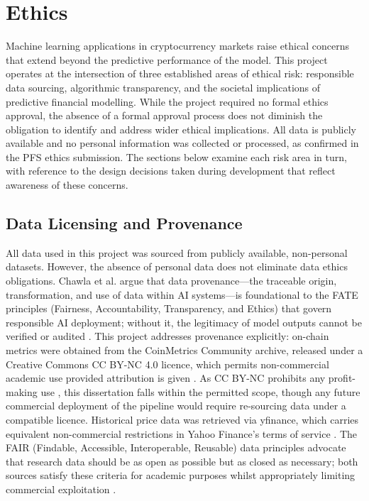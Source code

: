 
\section{Ethics}
\label{sec: Ethics}
Machine learning applications in cryptocurrency markets raise ethical concerns that extend beyond the predictive performance of the model. This project operates at the intersection of three established areas of ethical risk: responsible data sourcing, algorithmic transparency, and the societal implications of predictive financial modelling. While the project required no formal ethics approval, the absence of a formal approval process does not diminish the obligation to identify and address wider ethical implications. All data is publicly available and no personal information was collected or processed, as confirmed in the PFS ethics submission. The sections below examine each risk area in turn, with reference to the design decisions taken during development that reflect awareness of these concerns.
\subsection{Data Licensing and Provenance}
All data used in this project was sourced from publicly available, non-personal datasets. However, the absence of personal data does not eliminate data ethics obligations. Chawla et al. argue that data provenance—the traceable origin, transformation, and use of data within AI systems—is foundational to the FATE principles (Fairness, Accountability, Transparency, and Ethics) that govern responsible AI deployment; without it, the legitimacy of model outputs cannot be verified or audited \cite{memarianFairnessAccountabilityTransparency2023}. This project addresses provenance explicitly: on-chain metrics were obtained from the CoinMetrics Community archive, released under a Creative Commons CC BY-NC 4.0 licence, which permits non-commercial academic use provided attribution is given \cite{coinMetrics}. As CC BY-NC prohibits any profit-making use \cite{byBringingTransparencyData2025}, this dissertation falls within the permitted scope, though any future commercial deployment of the pipeline would require re-sourcing data under a compatible licence. Historical price data was retrieved via yfinance, which carries equivalent non-commercial restrictions in Yahoo Finance's terms of service \cite{YahooDeveloperAPI, YahooTermsService}. The FAIR (Findable, Accessible, Interoperable, Reusable) data principles advocate that research data should be as open as possible but as closed as necessary; both sources satisfy these criteria for academic purposes whilst appropriately limiting commercial exploitation \cite{wilkinsonFAIRGuidingPrinciples2016}.
